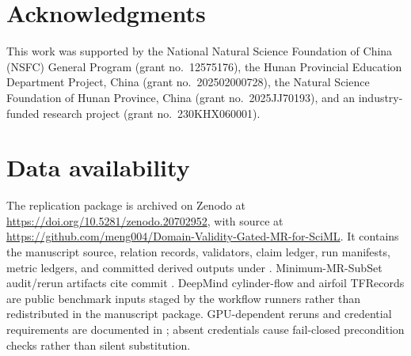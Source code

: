 \documentclass[preprint,12pt,authoryear]{elsarticle}
\let\paperbibliography
\renewcommand{}[1]{{\footnotesize\paperbibliography{#1}}}
\begin{document}
\section*{Acknowledgments}
This work was supported by the National Natural Science Foundation of China (NSFC) General Program (grant no.\ 12575176), the Hunan Provincial Education Department Project, China (grant no.\ 202502000728), the Natural Science Foundation of Hunan Province, China (grant no.\ 2025JJ70193), and an industry-funded research project (grant no.\ 230KHX060001).

\section*{Data availability}
The replication package is archived on Zenodo at \url{https://doi.org/10.5281/zenodo.20702952}, with source at \url{https://github.com/meng004/Domain-Validity-Gated-MR-for-SciML}. It contains the manuscript source, relation records, validators, claim ledger, run manifests, metric ledgers, and committed derived outputs under . Minimum-MR-SubSet audit/rerun artifacts cite commit . DeepMind cylinder-flow and airfoil TFRecords are public benchmark inputs staged by the workflow runners rather than redistributed in the manuscript package. GPU-dependent reruns and credential requirements are documented in ; absent credentials cause fail-closed precondition checks rather than silent substitution.



\end{document}
